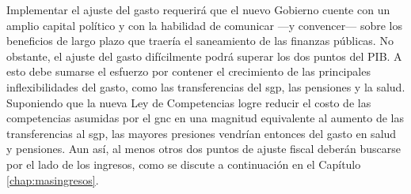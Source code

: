 Implementar el ajuste del gasto requerirá que el nuevo Gobierno cuente con un amplio capital político y con la habilidad de comunicar —y convencer— sobre los beneficios de largo plazo que traería el saneamiento de las finanzas públicas. No obstante, el ajuste del gasto difícilmente podrá superar los dos puntos del PIB. A esto debe sumarse el esfuerzo por contener el crecimiento de las principales inflexibilidades del gasto, como las transferencias del \gls{sgp}, las pensiones y la salud. Suponiendo que la nueva Ley de Competencias logre reducir el costo de las competencias asumidas por el \gls{gnc} en una magnitud equivalente al aumento de las transferencias al \gls{sgp}, las mayores presiones vendrían entonces del gasto en salud y pensiones. Aun así, al menos otros dos puntos de ajuste fiscal deberán buscarse por el lado de los ingresos, como se discute a continuación en el Capítulo \ref{chap:masingresos}.
